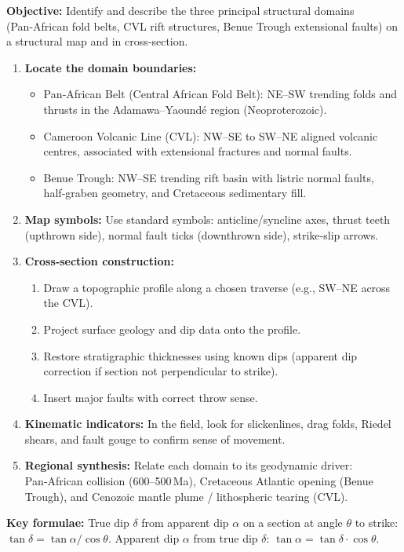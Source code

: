 \documentclass[11pt]{article}
\newcommand{\cle}[1]{{\popxbold\color{popdark}#1}}
\begin{document}
\begin{methode}
\textbf{Objective:} Identify and describe the three principal structural domains (Pan‑African fold belts, CVL rift structures, Benue Trough extensional faults) on a structural map and in cross‑section.
\begin{enumerate}
\item \textbf{Locate the domain boundaries:} 
\begin{itemize}
\item \cle{Pan‑African Belt (Central African Fold Belt)}: NE–SW trending folds and thrusts in the Adamawa–Yaoundé region (Neoproterozoic).
\item \cle{Cameroon Volcanic Line (CVL)}: NW–SE to SW–NE aligned volcanic centres, associated with extensional fractures and normal faults.
\item \cle{Benue Trough}: NW–SE trending rift basin with listric normal faults, half‑graben geometry, and Cretaceous sedimentary fill.
\end{itemize}
\item \textbf{Map symbols:} Use standard symbols: anticline/syncline axes, thrust teeth (upthrown side), normal fault ticks (downthrown side), strike‑slip arrows.
\item \textbf{Cross‑section construction:} 
\begin{enumerate}
\item Draw a topographic profile along a chosen traverse (e.g., SW–NE across the CVL).
\item Project surface geology and dip data onto the profile.
\item Restore stratigraphic thicknesses using known dips (apparent dip correction if section not perpendicular to strike).
\item Insert major faults with correct throw sense.
\end{enumerate}
\item \textbf{Kinematic indicators:} In the field, look for slickenlines, drag folds, Riedel shears, and fault gouge to confirm sense of movement.
\item \textbf{Regional synthesis:} Relate each domain to its geodynamic driver: Pan‑African collision (600–500\,Ma), Cretaceous Atlantic opening (Benue Trough), and Cenozoic mantle plume / lithospheric tearing (CVL).
\end{enumerate}
\textbf{Key formulae:} True dip $\delta$ from apparent dip $\alpha$ on a section at angle $\theta$ to strike: $\tan\delta = \tan\alpha / \cos\theta$. Apparent dip $\alpha$ from true dip $\delta$: $\tan\alpha = \tan\delta \cdot \cos\theta$.
\end{methode}
\end{document}
